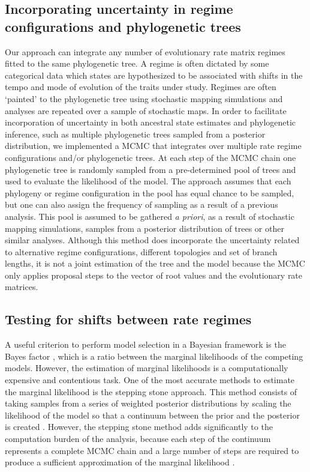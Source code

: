 \subsection{Incorporating uncertainty in regime configurations and phylogenetic trees}

Our approach can integrate any number of evolutionary rate matrix regimes fitted to the same phylogenetic tree. A regime is often dictated by some categorical data which states are hypothesized to be associated with shifts in the tempo and mode of evolution of the traits under study. Regimes are often `painted' to the phylogenetic tree using stochastic mapping simulations \citep{huelsenbeck_stochastic_2003} and analyses are repeated over a sample of stochastic maps. In order to facilitate incorporation of uncertainty in both ancestral state estimates and phylogenetic inference, such as multiple phylogenetic trees sampled from a posterior distribution, we implemented a MCMC that integrates over multiple rate regime configurations and/or phylogenetic trees. At each step of the MCMC chain one phylogenetic tree is randomly sampled from a pre-determined pool of trees and used to evaluate the likelihood of the model. The approach assumes that each phylogeny or regime configuration in the pool has equal chance to be sampled, but one can also assign the frequency of sampling as a result of a previous analysis. This pool is assumed to be gathered \textit{a priori}, as a result of stochastic mapping simulations, samples from a posterior distribution of trees or other similar analyses. Although this method does incorporate the uncertainty related to alternative regime configurations, different topologies and set of branch lengths, it is not a joint estimation of the tree and the model because the MCMC only applies proposal steps to the vector of root values and the evolutionary rate matrices. 

\subsection{Testing for shifts between rate regimes}

A useful criterion to perform model selection in a Bayesian framework is the Bayes factor \citep{kass_bayes_1995}, which is a ratio between the marginal likelihoods of the competing models. However, the estimation of marginal likelihoods is a computationally expensive and contentious task. One of the most accurate methods to estimate the marginal likelihood is the stepping stone approach. This method consists of taking samples from a series of weighted posterior distributions by scaling the likelihood of the model so that a continuum between the prior and the posterior is created \citep{fan_choosing_2011, xie_improving_2011, Uyeda_BayOU}. However, the stepping stone method adds significantly to the computation burden of the analysis, because each step of the continuum represents a complete MCMC chain and a large number of steps are required to produce a sufficient approximation of the marginal likelihood \citep{Uyeda_BayOU}.

